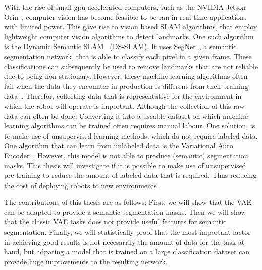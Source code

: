 With the rise of small gpu accelerated computers, such as the NVIDIA Jetson Orin~\cite{NVIDIA_Karumbunathan_2022}, computer vision has become feasible to be ran in real-time applications with limited power. This gave rise to vision based SLAM algorithms, that employ lightweight computer vision algorithms to detect landmarks. One such algorithm is the Dynamic Semantic SLAM~\cite{yu2018ds} (DS-SLAM). It uses SegNet~\cite{badri2017segnet}, a semantic segmentation network, that is able to classify each pixel in a given frame. These classifications can subsequently be used to remove landmarks that are not reliable due to being non-stationary. However, these machine learning algorithms often fail when the data they encounter in production is different from their training data~\cite{Goodfellow-et-al-2016,ozdag2018adversarial,warde201611,10.14778/3632093.3632098,DBLP:journals/corr/KurakinGB16a,10.1145/3422622}. Therefor, collecting data that is representative for the environment in which the robot will operate is important. Although the collection of this raw data can often be done. Converting it into a useable dataset on which machine learning algorithms can be trained often requires manual labour. One solution, is to make use of unsupervised learning methods, which do not require labeled data. One algorithm that can learn from unlabeled data is the Variational Auto Encoder~\cite{kingma2014autoencodingvariationalbayes}. However, this model is not able to produce (semantic) segmentation masks. This thesis will investigate if it is possible to make use of unsupervised pre-training to reduce the amount of labeled data that is required. Thus reducing the cost of deploying robots to new environments.

The contributions of this thesis are as follows; First, we will show that the VAE can be adapted to provide a semantic segmentation masks. Then we will show that the classic VAE tasks does not provide useful features for semantic segmentation. Finally, we will statistically proof that the most important factor in achieving good results is not necesarrily the amount of data for the task at hand, but adpating a model that is trained on a large classification dataset can provide huge improvements to the resulting network.
